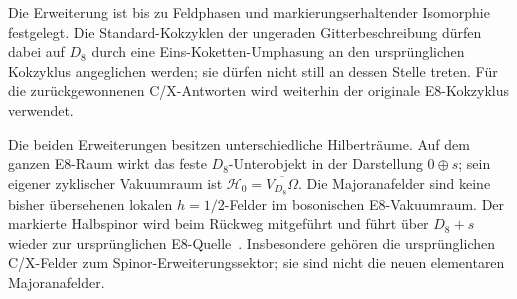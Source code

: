 Die Erweiterung ist bis zu Feldphasen und markierungserhaltender Isomorphie festgelegt. Die Standard-Kokzyklen der ungeraden Gitterbeschreibung dürfen dabei auf $D_8$ durch eine Eins-Koketten-Umphasung an den ursprünglichen Kokzyklus angeglichen werden; sie dürfen nicht still an dessen Stelle treten. Für die zurückgewonnenen C/X-Antworten wird weiterhin der originale E8-Kokzyklus verwendet.

\begin{center}
\end{center}

Die beiden Erweiterungen besitzen unterschiedliche Hilberträume. Auf dem ganzen E8-Raum wirkt das feste $D_8$-Unterobjekt in der Darstellung $0\oplus s$; sein eigener zyklischer Vakuumraum ist $\mathcal H_0=\overline{V_{D_8}\Omega}$. Die Majoranafelder sind keine bisher übersehenen lokalen $h=1/2$-Felder im bosonischen E8-Vakuumraum. Der markierte Halbspinor wird beim Rückweg mitgeführt und führt über $D_8+s$ wieder zur ursprünglichen E8-Quelle~\cite{chuzheng}. Insbesondere gehören die ursprünglichen C/X-Felder zum Spinor-Erweiterungssektor; sie sind nicht die neuen elementaren Majoranafelder.

